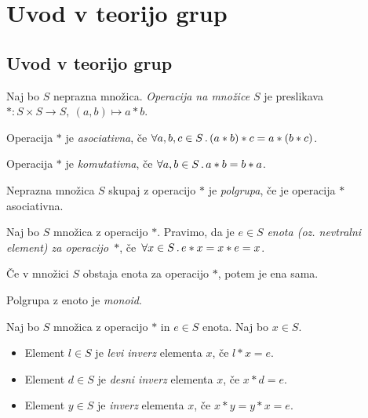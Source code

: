 \section{Uvod v teorijo grup}
\subsection{Uvod v teorijo grup}
\begin{definicija}
    Naj bo $S$ neprazna množica. \emph{Operacija na množice $S$} je preslikava $*: S \times S \to S, \ (a,b) \mapsto a * b$.

    Operacija $*$ je \emph{asociativna}, če $\forall a, b, c \in S \,.\, (a*b)*c = a*(b*c)$.

    Operacija $*$ je \emph{komutativna}, če $\forall a, b \in S \,.\, a* b = b* a$.
\end{definicija}

\begin{definicija}
    Neprazna množica $S$ skupaj z operacijo $*$ je \emph{polgrupa}, če je operacija $*$ asociativna.
\end{definicija}

\begin{definicija}
    Naj bo $S$ množica z operacijo $*$. Pravimo, da je $e \in S$ \emph{enota (oz. nevtralni element) za operacijo~$*$}, če~$\forall x \in S \,.\, e * x = x * e = x$.
\end{definicija}

\begin{trditev}
    Če v množici $S$ obstaja enota za operacijo $*$, potem je ena sama.
\end{trditev}

\begin{definicija}
    Polgrupa z enoto je \emph{monoid}.
\end{definicija}

\begin{definicija}
    Naj bo $S$ množica z operacijo $*$ in $e \in S$ enota. Naj bo $x \in S$.
    \begin{itemize}
        \item Element $l \in S$ je \emph{levi inverz} elementa $x$, če $l * x = e$.
        \item Element $d \in S$ je \emph{desni inverz} elementa $x$, če $x * d = e$.
        \item Element $y \in S$ je \emph{inverz} elementa $x$, če $x *y = y* x = e$.
    \end{itemize}
\end{definicija}


